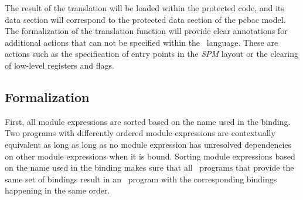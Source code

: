 The result of the translation will be loaded within the protected code, and its data section will correspond to the protected data section of the pcbac model.
The formalization of the translation function \cmath{\compile{\bullet}} will provide clear annotations for additional actions that can not be specified within the \LLVMIR\ language.
These are actions such as the specification of entry points in the \emph{SPM} layout or the clearing of low-level registers and flags.

\subsection{Formalization}
First, all module expressions are sorted based on the name used in the binding.
Two programs with differently ordered module expressions  are contextually equivalent as long as long as no module expression  has unresolved dependencies on other module expressions when it is bound.
Sorting module expressions based on the name used in the binding makes sure that all \MiniML\ programs that provide the same set of bindings result in an \LLVMIR\ program with the corresponding bindings happening in the same order.
 
\renewcommand{\makes}{& \ensuremath{\rightarrow} &}
\renewcommand{\compile}[1]{[[#1]]}
\newcommand{\intertextt}[1]{
& & \\
\multicolumn{3}{p{\textwidth}}{#1}\\
& & \\
}
\newcommand{\nl}{\\ & &}

